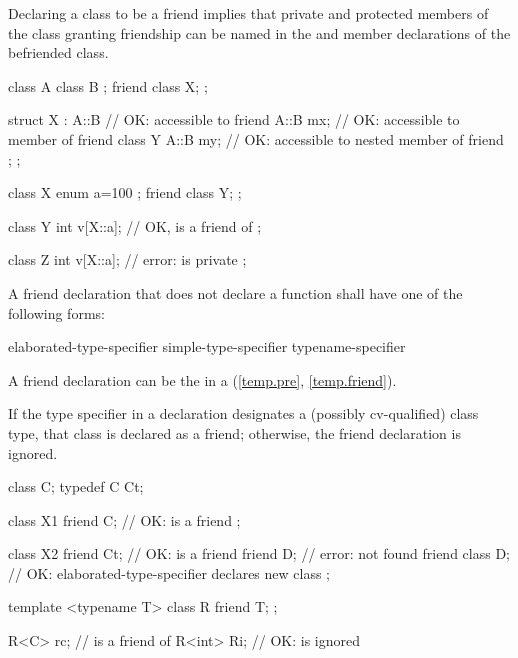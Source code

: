 \pnum
{}%
Declaring a class to be a friend implies that private and
protected members of the class granting friendship can be named in the
 and member declarations of the befriended
class.
\begin{example}
\begin{codeblock}
class A {
  class B { };
  friend class X;
};

struct X : A::B {               // OK:  accessible to friend
  A::B mx;                      // OK:  accessible to member of friend
  class Y {
    A::B my;                    // OK:  accessible to nested member of friend
  };
};
\end{codeblock}
\end{example}
\begin{example}
\begin{codeblock}
class X {
  enum { a=100 };
  friend class Y;
};

class Y {
  int v[X::a];                  // OK,  is a friend of 
};

class Z {
  int v[X::a];                  // error:  is private
};
\end{codeblock}
\end{example}

\pnum
A friend declaration that does not declare a function
shall have one of the following forms:
\begin{ncsimplebnf}
 elaborated-type-specifier \terminal{;}\br
{} simple-type-specifier \terminal{;}\br
{} typename-specifier \terminal{;}
\end{ncsimplebnf}

\begin{note}
A friend declaration can be the
 in a 
(\ref{temp.pre}, \ref{temp.friend}).
\end{note}
If the
type specifier in a  declaration designates a (possibly
cv-qualified) class type, that class is declared as a friend; otherwise, the
friend declaration is ignored.
\begin{example}
\begin{codeblock}
class C;
typedef C Ct;

class X1 {
  friend C;                     // OK:  is a friend
};

class X2 {
  friend Ct;                    // OK:  is a friend
  friend D;                     // error:  not found
  friend class D;               // OK: elaborated-type-specifier declares new class
};

template <typename T> class R {
  friend T;
};

R<C> rc;                        //  is a friend of 
R<int> Ri;                      // OK:  is ignored
\end{codeblock}
\end{example}

